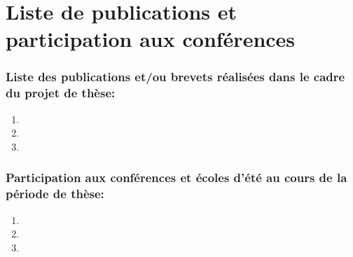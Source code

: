 \newpage
\chapter*{Liste de publications et participation aux conférences}
\subsection*{Liste des publications et/ou brevets réalisées dans le cadre du projet de thèse:}
\begin{enumerate}
\item 
\item 
\item 
\end{enumerate}


\subsection*{Participation aux conférences et écoles d’été au cours de la période de thèse:}
\begin{enumerate}
\item 
\item 
\item 
\end{enumerate}